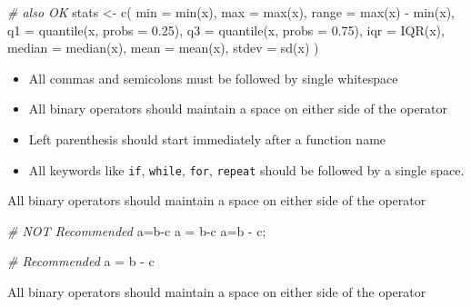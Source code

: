 \documentclass[
]{book}
\newenvironment{Shaded}{\begin{snugshade}}{\end{snugshade}}
\newcommand{\AttributeTok}[1]{\textcolor[rgb]{0.77,0.63,0.00}{#1}}
\newcommand{\CommentTok}[1]{\textcolor[rgb]{0.56,0.35,0.01}{\textit{#1}}}
\newcommand{\FloatTok}[1]{\textcolor[rgb]{0.00,0.00,0.81}{#1}}
\newcommand{\FunctionTok}[1]{\textcolor[rgb]{0.00,0.00,0.00}{#1}}
\newcommand{\NormalTok}[1]{#1}
\newcommand{\OtherTok}[1]{\textcolor[rgb]{0.56,0.35,0.01}{#1}}
\newcommand{\SpecialCharTok}[1]{\textcolor[rgb]{0.00,0.00,0.00}{#1}}
\providecommand{\tightlist}{%
  \setlength{\itemsep}{0pt}\setlength{\parskip}{0pt}}
\begin{document}
\begin{Shaded}
\begin{Highlighting}[]
\CommentTok{\# also OK}
\NormalTok{stats }\OtherTok{\textless{}{-}} \FunctionTok{c}\NormalTok{(}
  \AttributeTok{min    =} \FunctionTok{min}\NormalTok{(x), }
  \AttributeTok{max    =} \FunctionTok{max}\NormalTok{(x), }
  \AttributeTok{range  =} \FunctionTok{max}\NormalTok{(x) }\SpecialCharTok{{-}} \FunctionTok{min}\NormalTok{(x),}
  \AttributeTok{q1     =} \FunctionTok{quantile}\NormalTok{(x, }\AttributeTok{probs =} \FloatTok{0.25}\NormalTok{),}
  \AttributeTok{q3     =} \FunctionTok{quantile}\NormalTok{(x, }\AttributeTok{probs =} \FloatTok{0.75}\NormalTok{),}
  \AttributeTok{iqr    =} \FunctionTok{IQR}\NormalTok{(x),}
  \AttributeTok{median =} \FunctionTok{median}\NormalTok{(x), }
  \AttributeTok{mean   =} \FunctionTok{mean}\NormalTok{(x), }
  \AttributeTok{stdev  =} \FunctionTok{sd}\NormalTok{(x)}
\NormalTok{)}
\end{Highlighting}
\end{Shaded}

\begin{itemize}
\tightlist
\item
  All commas and semicolons must be followed by single whitespace
\item
  All binary operators should maintain a space on either side of the operator
\item
  Left parenthesis should start immediately after a function name
\item
  All keywords like \texttt{if}, \texttt{while}, \texttt{for}, \texttt{repeat} should be followed by a
  single space.
\end{itemize}

All binary operators should maintain a space on either side of the operator

\begin{Shaded}
\begin{Highlighting}[]
\CommentTok{\# NOT Recommended }
\NormalTok{a}\OtherTok{=}\NormalTok{b}\SpecialCharTok{{-}}\NormalTok{c}
\NormalTok{a }\OtherTok{=}\NormalTok{ b}\SpecialCharTok{{-}}\NormalTok{c}
\NormalTok{a}\OtherTok{=}\NormalTok{b }\SpecialCharTok{{-}}\NormalTok{ c; }

\CommentTok{\# Recommended }
\NormalTok{a }\OtherTok{=}\NormalTok{ b }\SpecialCharTok{{-}}\NormalTok{ c}
\end{Highlighting}
\end{Shaded}

All binary operators should maintain a space on either side of the operator
\end{document}
